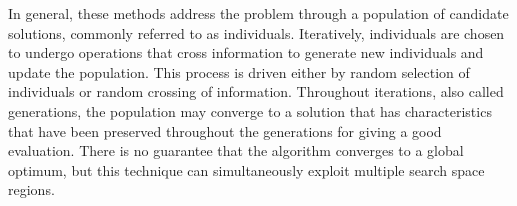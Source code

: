		In general, these methods address the problem through a population of candidate solutions, commonly referred to as individuals. Iteratively, individuals are chosen to undergo operations that cross information to generate new individuals and update the population. This process is driven either by random selection of individuals or random crossing of information. Throughout iterations, also called generations, the population may converge to a solution that has characteristics that have been preserved throughout the generations for giving a good evaluation. There is no guarantee that the algorithm converges to a global optimum, but this technique can simultaneously exploit multiple search space regions.
		
